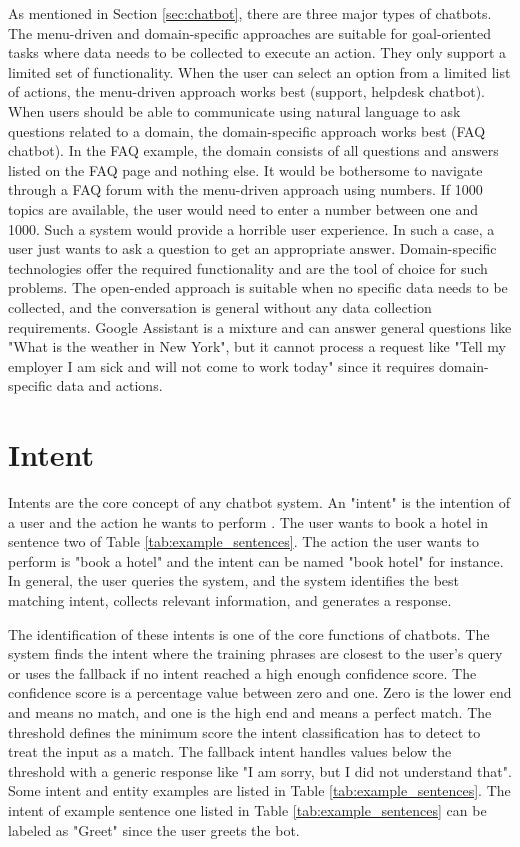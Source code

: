 As mentioned in Section \ref{sec:chatbot}, there are three major types of chatbots.
The menu-driven and domain-specific approaches are suitable for goal-oriented tasks where data needs to be collected to execute an action. 
They only support a limited set of functionality.
When the user can select an option from a limited list of actions, the menu-driven approach works best (support, helpdesk chatbot).
When users should be able to communicate using natural language to ask questions related to a domain, the domain-specific approach works best (FAQ chatbot).
In the FAQ example, the domain consists of all questions and answers listed on the FAQ page and nothing else.
It would be bothersome to navigate through a FAQ forum with the menu-driven approach using numbers.
If 1000 topics are available, the user would need to enter a number between one and 1000.
Such a system would provide a horrible user experience.
In such a case, a user just wants to ask a question to get an appropriate answer.
Domain-specific technologies offer the required functionality and are the tool of choice for such problems.
The open-ended approach is suitable when no specific data needs to be collected, and the conversation is general without any data collection requirements. 
Google Assistant is a mixture and can answer general questions like "What is the weather in New York", but it cannot process a request like "Tell my employer I am sick and will not come to work today" since it requires domain-specific data and actions.

\section{Intent} \label{sec:intent}
Intents are the core concept of any chatbot system.
An "intent" is the intention of a user and the action he wants to perform \cite{dutta2017developing, rahman2017programming}.
The user wants to book a hotel in sentence two of Table \ref{tab:example_sentences}.
The action the user wants to perform is "book a hotel" and the intent can be named "book hotel" for instance.
In general, the user queries the system, and the system identifies the best matching intent, collects relevant information, and generates a response.

The identification of these intents is one of the core functions of chatbots.
The system finds the intent where the training phrases are closest to the user's query or uses the fallback if no intent reached a high enough confidence score.
The confidence score is a percentage value between zero and one.
Zero is the lower end and means no match, and one is the high end and means a perfect match.
The threshold defines the minimum score the intent classification has to detect to treat the input as a match.
The fallback intent handles values below the threshold with a generic response like "I am sorry, but I did not understand that".
Some intent and entity examples are listed in Table \ref{tab:example_sentences}.
The intent of example sentence one listed in Table \ref{tab:example_sentences} can be labeled as "Greet" since the user greets the bot.

